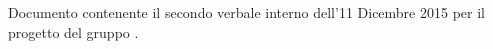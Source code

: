 Documento contenente il secondo verbale interno dell'11 Dicembre 2015 per il progetto \progetto{} del gruppo \gruppo{}.
